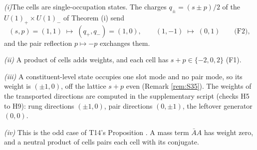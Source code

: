 \textit{(i)}\enspace The cells are single-occupation states. The charges $q_{\pm} = (s \pm p)/2$ of the $U(1)_{+} \times U(1)_{-}$ of Theorem (i) send
\[
(s, p) = (1, 1) \;\mapsto\; (q_{+}, q_{-}) = (1, 0), \qquad (1, -1) \;\mapsto\; (0, 1) \qquad \text{(F2)},
\]
and the pair reflection $p \mapsto -p$ exchanges them.



\emph{(ii)}  A product of cells adds weights, and each cell has $s + p \in \{-2, 0, 2\}$ (F1).



\emph{(iii)}  A constituent-level state occupies one slot mode and no pair mode, so its weight is $(\pm 1, 0)$, off the lattice $s + p$ even (Remark \ref{rem:S35}). The weights of the transported directions are computed in the supplementary script  (checks H5 to H9): rung directions $(\pm 1, 0)$, pair directions $(0, \pm 1)$, the leftover generator $(0,0)$.



\emph{(iv)}  This is the odd case of T14's Proposition . A mass term $\bar{A}A$ has weight zero, and a neutral product of cells pairs each cell with its conjugate.
